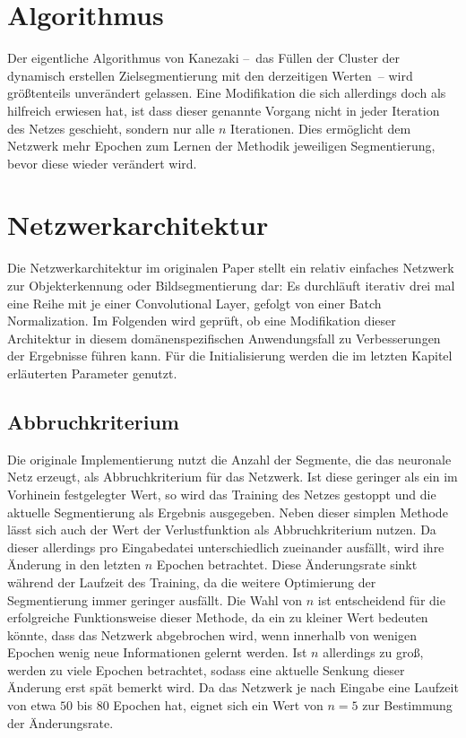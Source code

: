 \section{Algorithmus}
\label{sec:algorithm}

Der eigentliche Algorithmus von Kanezaki --~das Füllen der Cluster der dynamisch erstellen Zielsegmentierung mit den derzeitigen Werten~-- wird größtenteils unverändert gelassen. Eine Modifikation die sich allerdings doch als hilfreich erwiesen hat, ist dass dieser genannte Vorgang nicht in jeder Iteration des Netzes geschieht, sondern nur alle $n$ Iterationen. Dies ermöglicht dem Netzwerk mehr Epochen zum Lernen der Methodik jeweiligen Segmentierung, bevor diese wieder verändert wird.

\section{Netzwerkarchitektur}
\label{sec:network_architecture}

Die Netzwerkarchitektur im originalen Paper stellt ein relativ einfaches Netzwerk zur Objekterkennung oder Bildsegmentierung dar: Es durchläuft iterativ drei mal eine Reihe mit je einer Convolutional Layer, gefolgt von einer Batch Normalization. Im Folgenden wird geprüft, ob eine Modifikation dieser Architektur in diesem domänenspezifischen Anwendungsfall zu Verbesserungen der Ergebnisse führen kann. Für die Initialisierung werden die im letzten Kapitel erläuterten Parameter genutzt.

\iffalse
\subsection{Abbruchkriterium}
\label{ssec:stoppingcriteria}

Die originale Implementierung nutzt die Anzahl der Segmente, die das neuronale Netz erzeugt, als Abbruchkriterium für das Netzwerk. Ist diese geringer als ein im Vorhinein festgelegter Wert, so wird das Training des Netzes gestoppt und die aktuelle Segmentierung als Ergebnis ausgegeben. Neben dieser simplen Methode lässt sich auch der Wert der Verlustfunktion als Abbruchkriterium nutzen. Da dieser allerdings pro Eingabedatei unterschiedlich zueinander ausfällt, wird ihre Änderung in den letzten $n$ Epochen betrachtet. Diese Änderungsrate sinkt während der Laufzeit des Training, da die weitere Optimierung der Segmentierung immer geringer ausfällt. Die Wahl von $n$ ist entscheidend für die erfolgreiche Funktionsweise dieser Methode, da ein zu kleiner Wert bedeuten könnte, dass das Netzwerk abgebrochen wird, wenn innerhalb von wenigen Epochen wenig neue Informationen gelernt werden. Ist $n$ allerdings zu groß, werden zu viele Epochen betrachtet, sodass eine aktuelle Senkung dieser Änderung erst spät bemerkt wird. Da das Netzwerk je nach Eingabe eine Laufzeit von etwa $50$ bis $80$ Epochen hat, eignet sich ein Wert von $n=5$ zur Bestimmung der Änderungsrate. 


